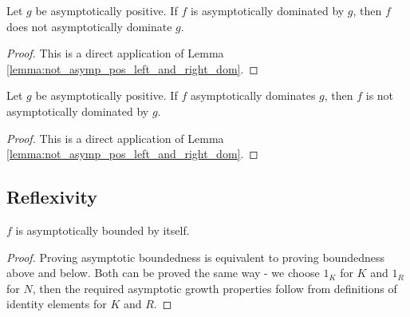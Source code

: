 \begin{theorem}
    \label{thm:not_asymp_pos_left_dom_of_right_dom}
    \leanok
    Let $g$ be asymptotically positive. If $f$ is asymptotically dominated by $g$, then
    $f$ does not asymptotically dominate $g$.
\end{theorem}

\begin{proof}
    \leanok
    This is a direct application of Lemma \ref{lemma:not_asymp_pos_left_and_right_dom}. 
\end{proof}

\begin{theorem}
    \label{thm:not_asymp_pos_right_dom_of_left_dom}
    \leanok
    Let $g$ be asymptotically positive. If $f$ asymptotically dominates $g$, then
    $f$ is not asymptotically dominated by $g$.
\end{theorem}

\begin{proof}
    \leanok
    This is a direct application of Lemma \ref{lemma:not_asymp_pos_left_and_right_dom}. 
\end{proof}


\subsection{Reflexivity}

\begin{lemma}
    \label{lemma:asymp_bounded_refl}
    \leanok
    $f$ is asymptotically bounded by itself. 

\end{lemma}

\begin{proof}
    \leanok
    Proving asymptotic boundedness is equivalent to proving boundedness above and below.
    Both can be proved the same way - we choose $1_K$ for $K$ and $1_R$ for $N$, then the
    required asymptotic growth properties follow from definitions of identity elements for 
    $K$ and $R$.
\end{proof}

